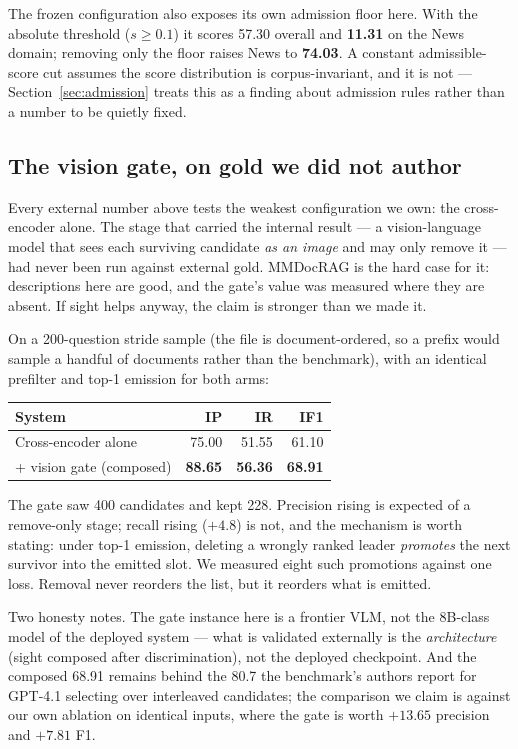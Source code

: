 \documentclass[journal]{IEEEtran}
\begin{document}
The frozen configuration also exposes its own admission floor here. With the
absolute threshold ($s \geq 0.1$) it scores 57.30 overall and \textbf{11.31} on
the News domain; removing only the floor raises News to \textbf{74.03}. A
constant admissible-score cut assumes the score distribution is corpus-invariant,
and it is not --- Section~\ref{sec:admission} treats this as a finding about
admission rules rather than a number to be quietly fixed.

\subsection{The vision gate, on gold we did not author}
\label{sec:composed-ext}

Every external number above tests the weakest configuration we own: the
cross-encoder alone. The stage that carried the internal result --- a
vision-language model that sees each surviving candidate \emph{as an image} and
may only remove it --- had never been run against external gold. MMDocRAG is
the hard case for it: descriptions here are good, and the gate's value was
measured where they are absent. If sight helps anyway, the claim is stronger
than we made it.

On a 200-question stride sample (the file is document-ordered, so a prefix
would sample a handful of documents rather than the benchmark), with an
identical prefilter and top-1 emission for both arms:

\begin{center}
\begin{tabular}{@{}lrrr@{}}
\toprule
System & IP & IR & IF1 \\
\midrule
Cross-encoder alone & 75.00 & 51.55 & 61.10 \\
+ vision gate (composed) & \textbf{88.65} & \textbf{56.36} & \textbf{68.91} \\
\bottomrule
\end{tabular}
\end{center}

The gate saw 400 candidates and kept 228. Precision rising is expected of a
remove-only stage; recall rising ($+4.8$) is not, and the mechanism is worth
stating: under top-1 emission, deleting a wrongly ranked leader \emph{promotes}
the next survivor into the emitted slot. We measured eight such promotions
against one loss. Removal never reorders the list, but it reorders what is
emitted.

Two honesty notes. The gate instance here is a frontier VLM, not the 8B-class
model of the deployed system --- what is validated externally is the
\emph{architecture} (sight composed after discrimination), not the deployed
checkpoint. And the composed 68.91 remains behind the 80.7 the benchmark's
authors report for GPT-4.1 selecting over interleaved candidates; the
comparison we claim is against our own ablation on identical inputs, where the
gate is worth $+13.65$ precision and $+7.81$ F1.
\end{document}

